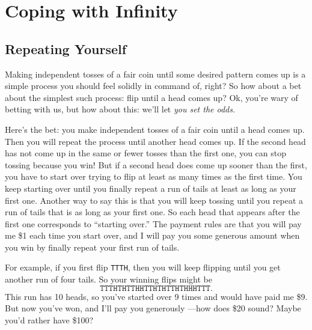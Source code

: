 
\section{Coping with Infinity}\label{infinite_expect_sec}

\subsection{Repeating Yourself}
Making independent tosses of a fair coin until some desired pattern
comes up is a simple process you should feel solidly in command of,
right?  So how about a bet about the simplest such process: flip until
a head comes up?  Ok, you're wary of betting with us, but how about
this: we'll let \emph{you set the odds}.

Here's the bet: you make independent tosses of a fair coin until a
head comes up.  Then you will repeat the process until another head
comes up.  If the second head has not come up in the same or fewer
tosses than the first one, you can stop tossing because you win!  But
if a second head does come up sooner than the first, you have to start
over trying to flip at least as many times as the first time.  You
keep starting over until you finally repeat a run of tails at least as
long as your first one.  Another way to say this is that you will keep
tossing until you repeat a run of tails that is as long as your first
one.  So each head that appears after the first one corresponds to
``starting over.''  The payment rules are that you will pay me \$1
each time you start over, and I will pay you some generous amount when
you win by finally repeat your first run of tails.

For example, if you first flip \texttt{TTTH}, then you will keep
flipping until you get another run of four tails.  So your winning
flips might be
\[
\texttt{TTTHTHTTHHTTHTHTTHTHHHTTT}.
\]
This run has 10 heads, so you've started over 9 times and would have
paid me \$9.  But now you've won, and I'll pay you generously ---how
does \$20 sound?  Maybe you'd rather have \$100?
